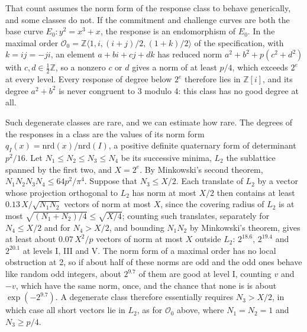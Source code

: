 \documentclass[version=preprint]{iacrcc}
\begin{document}
    That count assumes the norm form of the response class to behave
    generically, and some classes do not. If the commitment and challenge
    curves are both the base curve $E_0 \colon y^2 = x^3 + x$, the response is
    an endomorphism of $E_0$. In the maximal order $\mathcal{O}_0 = \mathbb{Z}\langle
    1, i, (i + j)/2, (1 + k)/2 \rangle$ of the specification, with $k = ij =
    -ji$, an element $a + bi + cj + dk$ has reduced norm $a^2 + b^2 + p(c^2 + d^2)$ with $c, d \in
    \frac{1}{2}\mathbb{Z}$, so a nonzero $c$ or $d$ gives a norm of at least
    $p/4$, which exceeds $2^e$ at every level. Every response of degree below
    $2^e$ therefore lies in $\mathbb{Z}[i]$, and its degree $a^2 + b^2$ is never
    congruent to 3 modulo 4: this class has no good degree at all.

    Such degenerate classes are rare, and we can estimate how rare. The
    degrees of the responses in a class are the values of its norm form
    $q_I(x) = \mathrm{nrd}(x)/\mathrm{nrd}(I)$, a positive definite quaternary
    form of determinant $p^2/16$. Let $N_1 \le N_2 \le N_3 \le N_4$ be its
    successive minima, $L_2$ the sublattice spanned by the first two, and $X =
    2^e$. By Minkowski's second theorem, $N_1 N_2 N_3 N_4 \le 64p^2/\pi^4$.
    Suppose that $N_3 \le X/2$. Each translate of $L_2$ by a vector whose
    projection orthogonal to $L_2$ has norm at most $X/2$ then contains at
    least $0.13\,X/\sqrt{N_1 N_2}$ vectors of norm at most $X$, since the
    covering radius of $L_2$ is at most $\sqrt{(N_1 + N_2)/4} \le
    \sqrt{X/4}$; counting such translates, separately for $N_4 \le X/2$ and
    for $N_4 > X/2$, and bounding $N_1 N_2$ by Minkowski's theorem, gives at
    least about $0.07\,X^2/p$ vectors of norm at most $X$ outside $L_2$:
    $2^{18.6}$, $2^{19.4}$ and $2^{20.1}$ at levels I, III and V. The norm
    form of a maximal order has no local obstruction at 2, so if about half
    of these norms are odd and the odd ones behave like random odd integers,
    about $2^{9.7}$ of them are good at level I, counting $v$ and $-v$, which have the same norm, once, and the chance that none is is about $\exp(-2^{9.7})$. A degenerate class
    therefore essentially requires $N_3 > X/2$, in which case all short
    vectors lie in $L_2$, as for $\mathcal{O}_0$ above, where $N_1 = N_2 =
    1$ and $N_3 \ge p/4$.
\end{document}
